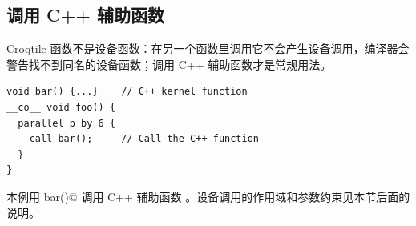 \subsection*{调用 C++ 辅助函数}

Croqtile 函数不是设备函数：在另一个函数里调用它不会产生设备调用，编译器会警告找不到同名的设备函数；调用 C++ 辅助函数才是常规用法。

\begin{lstlisting}[language=croqtile,caption={用 call 调用 C++ 辅助函数}]
void bar() {...}    // C++ kernel function
__co__ void foo() {
  parallel p by 6 {
    call bar();     // Call the C++ function
  }
}
\end{lstlisting}

本例用 \co@call bar()@ 调用 C++ 辅助函数 \co@bar@。设备调用的作用域和参数约束见本节后面的说明。
